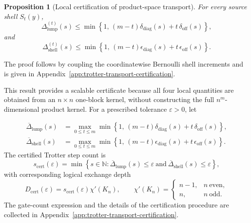 \documentclass[a4paper,onecolumn,11pt,unpublished]{quantumarticle}
\newtheorem{proposition}[theorem]{Proposition}
\theoremstyle{remark}
\begin{document}
\begin{proposition}[Local certification of product-space transport]
\label{prop:local-product-transport-bounds}
For every source shell \(S_t(y)\),
\begin{equation}
\Delta_{\mathrm{lump}}^{(t)}(s)
\leq
\min\!\left\{
1,\,
(m-t)\delta_{\mathrm{diag}}(s)
+
t\,\delta_{\mathrm{off}}(s)
\right\},
\label{eq:lumpability-local-upper-bound}
\end{equation}
and
\begin{equation}
\Delta_{\mathrm{shell}}^{(t)}(s)
\leq
\min\!\left\{
1,\,
(m-t)\epsilon_{\mathrm{diag}}(s)
+
t\,\epsilon_{\mathrm{off}}(s)
\right\}.
\label{eq:shell-kernel-local-upper-bound}
\end{equation}
\end{proposition}

The proof follows by coupling the coordinatewise Bernoulli shell increments
and is given in
Appendix~\ref{app:trotter-transport-certification}.

This result provides a scalable certificate because all four local quantities are obtained from an \(n\times n\) one-block kernel, without constructing the full \(n^m\)-dimensional product kernel. For a prescribed tolerance \(\varepsilon>0\), let

\begin{align}
\overline{\Delta}_{\mathrm{lump}}(s)
&=
\max_{0\leq t\leq m}
\min\!\left\{
1,\,
(m-t)\delta_{\mathrm{diag}}(s)
+
t\,\delta_{\mathrm{off}}(s)
\right\},
\\
\overline{\Delta}_{\mathrm{shell}}(s)
&=
\max_{0\leq t\leq m}
\min\!\left\{
1,\,
(m-t)\epsilon_{\mathrm{diag}}(s)
+
t\,\epsilon_{\mathrm{off}}(s)
\right\}.
\end{align}
The certified Trotter step count is
\begin{equation}
s_{\mathrm{cert}}(\varepsilon)
=
\min\left\{
s\in\mathbb N:
\overline{\Delta}_{\mathrm{lump}}(s)\leq\varepsilon
\ \text{and}\
\overline{\Delta}_{\mathrm{shell}}(s)\leq\varepsilon
\right\},
\label{eq:certified-trotter-step}
\end{equation}
with corresponding logical exchange depth
\begin{equation}
D_{\mathrm{cert}}(\varepsilon)
=
s_{\mathrm{cert}}(\varepsilon)\chi'(K_n),
\qquad
\chi'(K_n)
=
\begin{cases}
n-1, & n\ \text{even},\\
n, & n\ \text{odd}.
\end{cases}
\label{eq:certified-trotter-depth}
\end{equation}
The gate-count expression and the details of the certification
procedure are collected in Appendix~\ref{app:trotter-transport-certification}.
\end{document}
